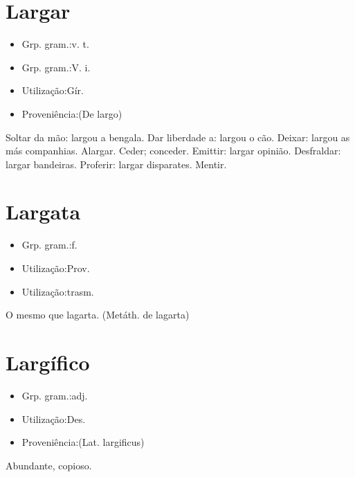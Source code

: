 \section{Largar}
\begin{itemize}
\item {Grp. gram.:v. t.}
\end{itemize}
\begin{itemize}
\item {Grp. gram.:V. i.}
\end{itemize}
\begin{itemize}
\item {Utilização:Gír.}
\end{itemize}
\begin{itemize}
\item {Proveniência:(De \textunderscore largo\textunderscore )}
\end{itemize}
Soltar da mão: \textunderscore largou a bengala\textunderscore .
Dar liberdade a: \textunderscore largou o cão\textunderscore .
Deixar: \textunderscore largou as más companhias\textunderscore .
Alargar.
Ceder; conceder.
Emittir: \textunderscore largar opinião\textunderscore .
Desfraldar: \textunderscore largar bandeiras\textunderscore .
Proferir: \textunderscore largar disparates\textunderscore .
Mentir.
\section{Largata}
\begin{itemize}
\item {Grp. gram.:f.}
\end{itemize}
\begin{itemize}
\item {Utilização:Prov.}
\end{itemize}
\begin{itemize}
\item {Utilização:trasm.}
\end{itemize}
O mesmo que \textunderscore lagarta\textunderscore .
(Metáth. de \textunderscore lagarta\textunderscore )
\section{Largífico}
\begin{itemize}
\item {Grp. gram.:adj.}
\end{itemize}
\begin{itemize}
\item {Utilização:Des.}
\end{itemize}
\begin{itemize}
\item {Proveniência:(Lat. \textunderscore largificus\textunderscore )}
\end{itemize}
Abundante, copioso.
